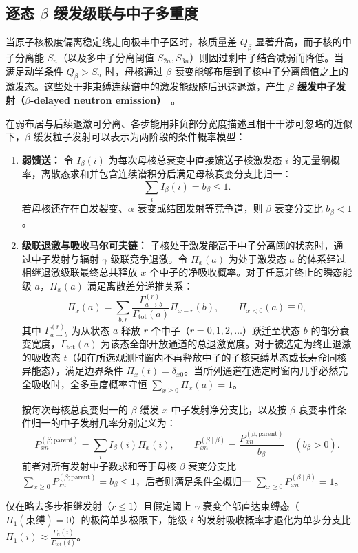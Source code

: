 \subsection{逐态 $\beta$ 缓发级联与中子多重度}\label{sec:4-7-2}

当原子核极度偏离稳定线走向极丰中子区时，核质量差 $Q_\beta$ 显著升高，而子核的中子分离能 $S_n$（以及多中子分离阈值 $S_{2n}, S_{3n}$）则因过剩中子结合减弱而降低。当满足动学条件 $Q_\beta > S_n$ 时，母核通过 $\beta$ 衰变能够布居到子核中子分离阈值之上的激发态。这些处于非束缚连续谱中的激发能级随后迅速退激，产生 \textbf{$\beta$ 缓发中子发射（$\beta$-delayed neutron emission）}~\cite{dimitriou-2021-iaea-beta-delayed-neutron-database}。

在弱布居与后续退激可分离、各步能用非负部分宽度描述且相干干涉可忽略的近似下，$\beta$ 缓发粒子发射可以表示为两阶段的条件概率模型：
\begin{enumerate}
\item \textbf{弱馈送：} 令 $I_\beta(i)$ 为每次母核总衰变中直接馈送子核激发态 $i$ 的无量纲概率，离散态求和并包含连续谱积分后满足母核衰变分支比归一：
\begin{equation}\label{eq:4-7-beta-feeding-normalization}
\sum_i I_\beta(i) = b_\beta \le 1.
\end{equation}
若母核还存在自发裂变、$\alpha$ 衰变或结团发射等竞争道，则 $\beta$ 衰变分支比 $b_\beta < 1$。
\item \textbf{级联退激与吸收马尔可夫链：} 子核处于激发能高于中子分离阈的状态时，通过中子发射与辐射 $\gamma$ 级联竞争退激。令 $\Pi_x(a)$ 为处于激发态 $a$ 的体系经过相继退激级联最终总共释放 $x$ 个中子的净吸收概率。对于任意非终止的瞬态能级 $a$，$\Pi_x(a)$ 满足离散差分递推关系：
\begin{equation}\label{eq:4-7-cascade-pi-def}
\Pi_x(a) = \sum_{b, r} \frac{\Gamma^{(r)}_{a \to b}}{\Gamma_{\mathrm{tot}}(a)} \Pi_{x-r}(b), \qquad \Pi_{x < 0}(a) \equiv 0,
\end{equation}
其中 $\Gamma^{(r)}_{a \to b}$ 为从状态 $a$ 释放 $r$ 个中子（$r = 0, 1, 2, \dots$）跃迁至状态 $b$ 的部分衰变宽度，$\Gamma_{\mathrm{tot}}(a)$ 为该态全部开放通道的总退激宽度。对于被选定为终止退激的吸收态 $t$（如在所选观测时窗内不再释放中子的子核束缚基态或长寿命同核异能态），满足边界条件 $\Pi_x(t) = \delta_{x0}$。当所列通道在选定时窗内几乎必然完全吸收时，全多重度概率守恒 $\sum_{x \ge 0} \Pi_x(a) = 1$。

按每次母核总衰变归一的 $\beta$ 缓发 $x$ 中子发射净分支比，以及按 $\beta$ 衰变事件条件归一的中子发射几率分别定义为：
\begin{equation}\label{eq:4-7-conditional-probability}
P_{xn}^{(\beta;\mathrm{parent})} = \sum_i I_\beta(i) \Pi_x(i), \qquad P_{xn}^{(\beta \mid \beta)} = \frac{P_{xn}^{(\beta;\mathrm{parent})}}{b_\beta} \quad (b_\beta > 0).
\end{equation}
前者对所有发射中子数求和等于母核 $\beta$ 衰变分支比 $\sum_{x \ge 0} P_{xn}^{(\beta;\mathrm{parent})} = b_\beta \le 1$，后者则满足条件全概归一 $\sum_{x \ge 0} P_{xn}^{(\beta \mid \beta)} = 1$。
\end{enumerate}
仅在略去多步相继发射（$r \le 1$）且假定阈上 $\gamma$ 衰变全部直达束缚态（$\Pi_1(\text{束缚}) = 0$）的极简单步极限下，能级 $i$ 的发射吸收概率才退化为单步分支比 $\Pi_1(i) \approx \frac{\Gamma_n(i)}{\Gamma_{\mathrm{tot}}(i)}$。

